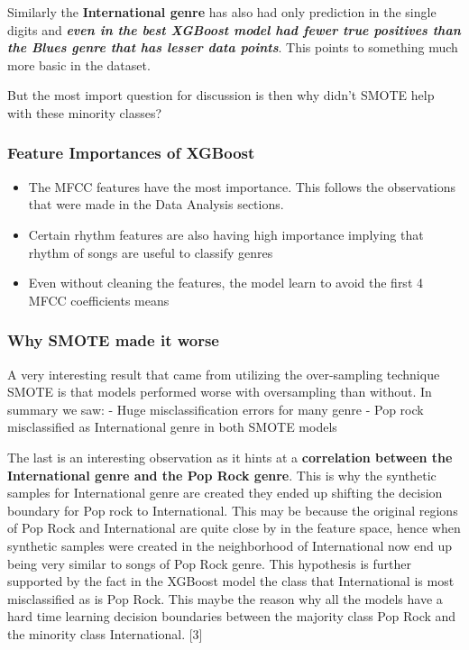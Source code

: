 \documentclass[11pt]{article}
\providecommand{\tightlist}{%
      \setlength{\itemsep}{0pt}\setlength{\parskip}{0pt}}
\begin{document}
Similarly the \textbf{International genre} has also had only prediction
in the single digits and \textbf{\emph{even in the best XGBoost model
had fewer true positives than the Blues genre that has lesser data
points}}. This points to something much more basic in the dataset.

But the most import question for discussion is then why didn't SMOTE
help with these minority classes?

\hypertarget{feature-importances-of-xgboost}{%
\subsubsection{Feature Importances of
XGBoost}\label{feature-importances-of-xgboost}}

\begin{itemize}
\tightlist
\item
  The MFCC features have the most importance. This follows the
  observations that were made in the Data Analysis sections.
\item
  Certain rhythm features are also having high importance implying that
  rhythm of songs are useful to classify genres
\item
  Even without cleaning the features, the model learn to avoid the first
  4 MFCC coefficients means
\end{itemize}

\hypertarget{why-smote-made-it-worse}{%
\subsubsection{Why SMOTE made it worse}\label{why-smote-made-it-worse}}

A very interesting result that came from utilizing the over-sampling
technique SMOTE is that models performed worse with oversampling than
without. In summary we saw: - Huge misclassification errors for many
genre - Pop rock misclassified as International genre in both SMOTE
models

The last is an interesting observation as it hints at a
\textbf{correlation between the International genre and the Pop Rock
genre}. This is why the synthetic samples for International genre are
created they ended up shifting the decision boundary for Pop rock to
International. This may be because the original regions of Pop Rock and
International are quite close by in the feature space, hence when
synthetic samples were created in the neighborhood of International now
end up being very similar to songs of Pop Rock genre. This hypothesis is
further supported by the fact in the XGBoost model the class that
International is most misclassified as is Pop Rock. This maybe the
reason why all the models have a hard time learning decision boundaries
between the majority class Pop Rock and the minority class
International. {[}3{]}
\end{document}
